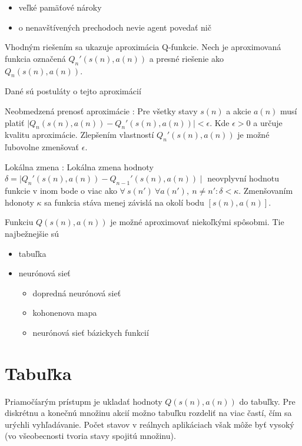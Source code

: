 \begin{itemize}
\item veľké pamäťové nároky
\item o nenavštívených prechodoch nevie agent povedať nič
\end{itemize}

Vhodným riešením sa ukazuje aproximácia Q-funkcie.
Nech je aproximovaná funkcia označená $Q_n'(s(n), a(n))$ a presné riešenie ako $Q_n(s(n), a(n))$.

Dané sú postuláty o tejto aproximácií
\begin{theorem}{Neobmedzená prenosť aproximácie : }
\label{post:01}
Pre všetky stavy $s(n)$ a akcie $a(n)$ musí platiť
$\mid Q_n(s(n), a(n)) - Q_n'(s(n), a(n)) \mid < \epsilon $. Kde $\epsilon > 0$ a
určuje kvalitu aproximácie. Zlepšením vlastností $Q_n'(s(n), a(n))$ je možné
ľubovolne zmenšovať  $\epsilon$.
\end{theorem}

\begin{theorem}{Lokálna zmena : }
\label{post:02}
Lokálna zmena hodnoty $\delta = \mid Q_n'(s(n), a(n)) - Q_{n-1}'(s(n), a(n)) \mid$ neovplyvní hodnotu funkcie v
inom bode o viac ako $\forall \ s(n') \ \forall a(n'),\ n \neq n' : \delta < \kappa$.
Zmenšovaním hdonoty $\kappa$ sa funkcia stáva menej závislá na okolí bodu $[s(n), a(n)]$.
\end{theorem}

Funkciu $Q(s(n), a(n))$ je možné aproximovať niekoľkými spôsobmi.
Tie najbežnejšie sú

\begin{itemize}
\item tabuľka
\item neurónová sieť
  \begin{itemize}
    \item dopredná neurónová sieť
    \item kohonenova mapa
    \item neurónová sieť bázickych funkcií
  \end{itemize}
\end{itemize}

\section{Tabuľka}

Priamočíarým prístupm je ukladať hodnoty $Q(s(n), a(n))$ do tabuľky. Pre
diskrétnu a konečnú množinu akcií možno tabuľku rozdeliť na viac častí,
čím sa urýchli vyhľadávanie. Počet stavov v reálnych aplikáciach však môže byť
vysoký (vo všeobecnosti tvoria stavy spojitú množinu).

